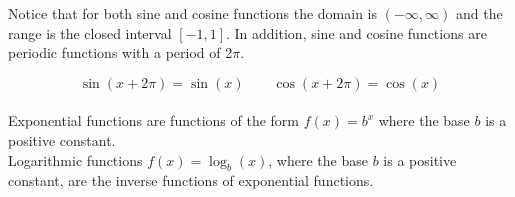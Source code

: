 Notice that for both sine and cosine functions the domain is \((-\infty, \infty)\) and the range is the closed interval \([-1, 1]\). In addition, sine and cosine functions are periodic functions with a period of 2\(\pi\). 

$$\sin(x+2\pi)=\sin(x) \quad \quad \cos(x+2\pi)=\cos(x)$$\\

Exponential functions are functions of the form \(f(x)=b^x\) where the base \(b\) is a positive constant.\\

Logarithmic functions \(f(x)=\log_b(x)\), where the base \(b\) is a positive constant, are the inverse functions of exponential functions.\\
